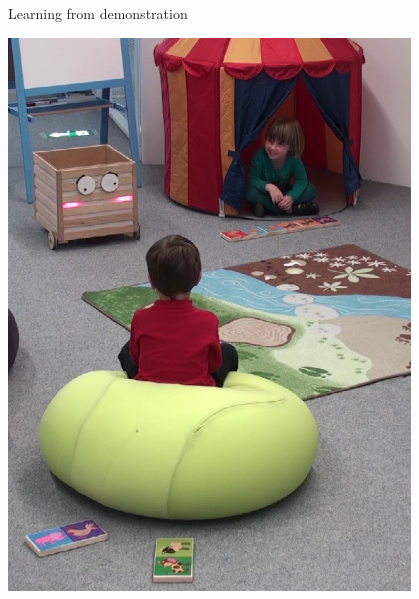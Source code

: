 \documentclass[compress]{beamer}
\begin{document}

\begin{frame}{Learning from demonstration}
    \centering
     {
    }

     {
    \includegraphics[width=0.8\textwidth]{domino-mistake}
    }
\end{frame}
\end{document}
